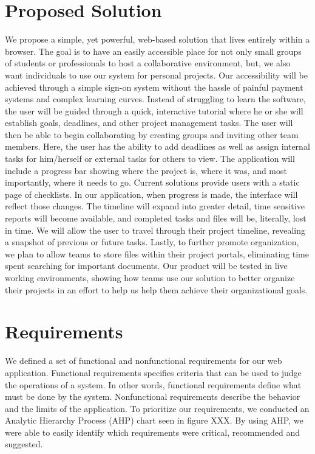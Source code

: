 \section{Proposed Solution}

We propose a simple, yet powerful, web-based solution that lives entirely within a browser. The goal is to have an easily accessible place for not only small groups of students or professionals to host a collaborative environment, but, we also want individuals to use our system for personal projects. Our accessibility will be achieved through a simple sign-on system without the hassle of painful payment systems and complex learning curves. Instead of struggling to learn the software, the user will be guided through a quick, interactive tutorial where he or she will establish goals, deadlines, and other project management tasks. The user will then be able to begin collaborating by creating groups and inviting other team members. Here, the user has the ability to add deadlines as well as assign internal tasks for him/herself or external tasks for others to view. The application will include a progress bar showing where the project is, where it was, and most importantly, where it needs to go. Current solutions provide users with a static page of checklists. In our application, when progress is made, the interface will reflect those changes. The timeline will expand into greater detail, time sensitive reports will become available, and completed tasks and files will be, literally, lost in time.  We will allow the user to travel through their project timeline, revealing a snapshot of previous or future tasks. Lastly, to further promote organization, we plan to allow teams to store files within their project portals, eliminating time spent searching for important documents. Our product will be tested in live working environments, showing how teams use our solution to better organize their projects in an effort to help us help them achieve their organizational goals. 

\section{Requirements}
We defined a set of functional and nonfunctional requirements for our web application. Functional requirements specifies criteria that can be used to judge the operations of a system. In other words, functional requirements define what must be done by the system. Nonfunctional requirements describe the behavior and the limits of the application. To prioritize our requirements, we conducted an Analytic Hierarchy Process (AHP) chart seen in figure XXX. By using AHP, we were able to easily identify which requirements were critical, recommended and suggested. 
